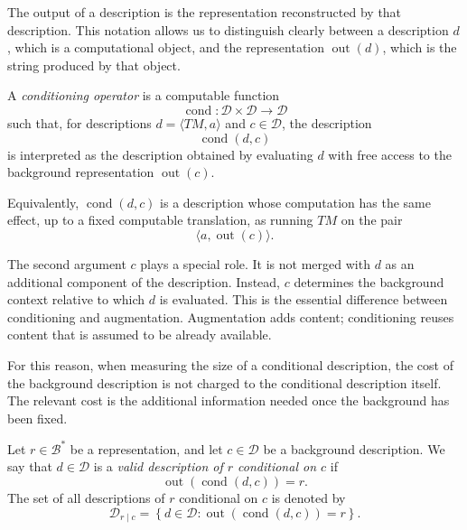 The output of a description is the representation reconstructed by that
description. This notation allows us to distinguish clearly between a
description \(d\), which is a computational object, and the representation
\(\operatorname{out}(d)\), which is the string produced by that object.

\begin{definition}
\label{def:conditioning_operator}
A \emph{conditioning operator} is a computable
function
\[
\operatorname{cond}:\mathcal D\times \mathcal D\to \mathcal D
\]
such that, for descriptions \(d=\langle TM,a\rangle\) and
\(c\in\mathcal D\), the description
\[
\operatorname{cond}(d,c)
\]
is interpreted as the description obtained by evaluating \(d\) with free access
to the background representation \(\operatorname{out}(c)\).

Equivalently, \(\operatorname{cond}(d,c)\) is a description whose computation
has the same effect, up to a fixed computable translation, as running \(TM\) on
the pair
\[
\langle a,\operatorname{out}(c)\rangle .
\]
\end{definition}

The second argument \(c\) plays a special role. It is not merged with \(d\) as
an additional component of the description. Instead, \(c\) determines the
background context relative to which \(d\) is evaluated. This is the essential
difference between conditioning and augmentation. Augmentation adds content;
conditioning reuses content that is assumed to be already available.

For this reason, when measuring the size of a conditional description, the cost
of the background description is not charged to the conditional description
itself. The relevant cost is the additional information needed once the
background has been fixed.

\begin{definition}
\label{def:conditional_description}
Let \(r\in\mathcal B^\ast\) be a representation, and let
\(c\in\mathcal D\) be a background description. We say that
\(d\in\mathcal D\) is a \emph{valid description of \(r\) conditional on \(c\)}
 if
\[
\operatorname{out}(\operatorname{cond}(d,c))=r.
\]
The set of all descriptions of \(r\) conditional on \(c\) is denoted by
\[
\mathcal D_{r\mid c}
=
\left\{
d\in\mathcal D :
\operatorname{out}(\operatorname{cond}(d,c))=r
\right\}.
\]
\end{definition}

